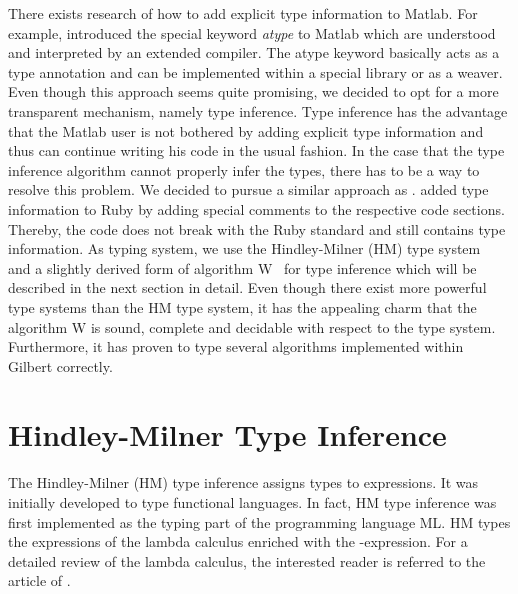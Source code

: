 There exists research of how to add explicit type information to Matlab.
For example, \textcite{hendren:2011a} introduced the special keyword \emph{atype} to Matlab which are understood and interpreted by an extended compiler.
The atype keyword basically acts as a type annotation and can be implemented within a special library or as a weaver.
Even though this approach seems quite promising, we decided to opt for a more transparent mechanism, namely type inference.
Type inference has the advantage that the Matlab user is not bothered by adding explicit type information and thus can continue writing his code in the usual fashion.
In the case that the type inference algorithm cannot properly infer the types, there has to be a way to resolve this problem.
We decided to pursue a similar approach as \textcite{furr:2009a}.
\citeauthor{furr:2009a} added type information to Ruby by adding special comments to the respective code sections.
Thereby, the code does not break with the Ruby standard and still contains type information.
As typing system, we use the Hindley-Milner (HM) type system~\cite{hindley:tams1969a,milner:jcss1978a} and a slightly derived form of algorithm W~\cite{damas:1982a} for type inference which will be described in the next section in detail.
Even though there exist more powerful type systems than the HM type system, it has the appealing charm that the algorithm W is sound, complete and decidable with respect to the type system.
Furthermore, it has proven to type several algorithms implemented within Gilbert correctly.

\section{Hindley-Milner Type Inference}
\label{sec:hmInference}

The Hindley-Milner (HM) type inference assigns types to expressions.
It was initially developed to type functional languages.
In fact, HM type inference was first implemented as the typing part of the programming language ML.
HM types the expressions of the lambda calculus enriched with the -expression.
For a detailed review of the lambda calculus, the interested reader is referred to the article of \textcite{cardone:hhl2006a}.

